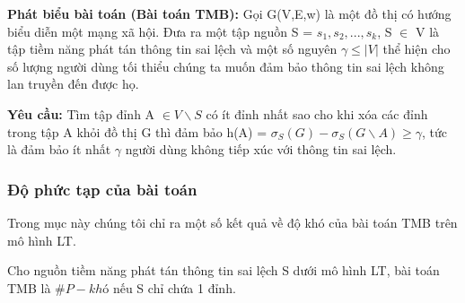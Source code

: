 \textbf{Phát biểu bài toán (Bài toán TMB):} Gọi G(V,E,w) là một đồ thị có hướng biểu diễn một mạng xã hội. Đưa ra một tập nguồn S = {$s_{1}, s_{2}, ... , s_{k}$}, S $\in$ V là tập tiềm năng phát tán thông tin sai lệch và một số nguyên $\gamma \leq | V |$ thể hiện cho số lượng người dùng tối thiểu chúng ta muốn đảm bảo thông tin sai lệch không lan truyền đến được họ.

\textbf{Yêu cầu:} Tìm tập đỉnh A $\in V \backslash S$ có ít đỉnh nhất sao cho khi xóa các đỉnh trong tập A khỏi đồ thị G thì đảm bảo h(A) = $\sigma_{S}(G) - \sigma_{S}(G \backslash A) \geq \gamma$, tức là đảm bảo ít nhất $\gamma$ người dùng không tiếp xúc với thông tin sai lệch.
\subsubsection{Độ phức tạp của bài toán}		
Trong mục này chúng tôi chỉ ra một số kết quả về độ khó của bài toán TMB trên mô hình LT.
\begin{theo}
	Cho nguồn tiềm năng phát tán thông tin sai lệch S dưới mô hình LT, bài toán TMB là $\#P-khó$ nếu S chỉ chứa 1 đỉnh.
\end{theo}
